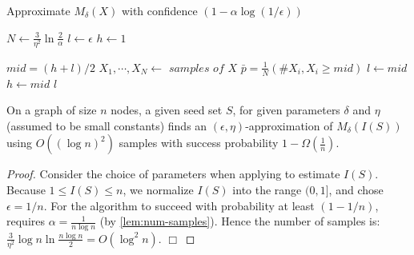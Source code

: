 \begin{algorithm}
  \caption{Approximate ${M_{\delta}(X)}$ with confidence
            $(1 - \alpha \log(1/\epsilon))$ }
  \label{alg:1}
  \begin{algorithmic}[1]
    \State $N \gets \frac{3}{\eta^2}\ln{\frac{2}{\alpha}}$
    \State $l \gets \epsilon$
    \State $h \gets 1$

      \State $\mathit{mid} = (h + l) / 2$
      \State $X_1,\cdots,X_N \gets \textit{ samples of } X $
      \State $\bar p = \frac{1}{N}(\# X_i, X_i \geq \mathit{mid})$
       $l \gets \mathit{mid}$
      \Else \enskip $h \gets \mathit{mid}$
      \EndIf
    \EndWhile
    \Return $l$
    \EndFunction
  \end{algorithmic}
\end{algorithm}
\begin{theorem} 
\label{thr:numsmpls}
  On a graph of size $n$ nodes,  a given seed set $S$, for  given parameters
   $\delta$ and $\eta$ (assumed
  to be small constants)
   finds an $(\epsilon, \eta)$-approximation of $M_{\delta}(I(S))$ using $O((\log n)^2)$ samples with success probability
  $1- \Omega\left(\frac{1}{n}\right)$.
\end{theorem}
\begin{proof}
Consider the choice of parameters when applying  to estimate $I(S)$. Because $1 \leq
I(S) \leq n$, we normalize $I(S)$ into the range $(0,1]$, and chose $\epsilon = 1/n$.
For the algorithm to succeed with probability at least $(1 - 1/n)$,
requires $\alpha = \frac{1}{n \log n}$ (by \cref{lem:num-samples}). 
 Hence the number of
samples is:$\frac{3}{\eta^2}\log{n}\ln{\frac{n\log n}{2}} = O(\log^2 n)$.
$\Box$
\end{proof}